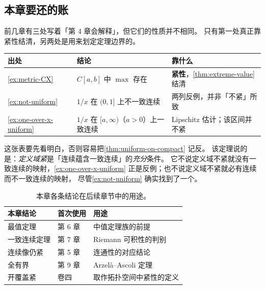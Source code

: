 \subsection*{本章要还的账}

前几章有三处写着「第 4 章会解释」，但它们的性质并不相同。
只有第一处真正靠紧性结清，另两处是用来划定定理边界的。

\begin{center}
\begin{tabular}{@{}llp{4.4cm}@{}}
  \toprule
  出处 & 结论 & 靠什么 \\
  \midrule
  \cref{ex:metric-CX} & \(C[a,b]\) 中 \(\max\) 存在 & \textbf{紧性}，\cref{thm:extreme-value} 结清 \\
  \cref{ex:not-uniform} & \(1/x\) 在 \((0,1]\) 上不一致连续 & 两列反例，并非「不紧」所致 \\
  \cref{ex:one-over-x-uniform} & \(1/x\) 在 \([a,\infty)\)（\(a>0\)）上一致连续 & Lipschitz 估计；该区间并不紧 \\
  \bottomrule
\end{tabular}
\end{center}

\begin{remark}
  这张表要先看明白，否则容易把\cref{thm:uniform-on-compact} 记反。
  该定理说的是：\emph{定义域紧}是「连续蕴含一致连续」的\emph{充分}条件。
  它不说定义域不紧就没有一致连续的映射，\cref{ex:one-over-x-uniform}
  正是反例；也不说定义域不紧就必有连续而不一致连续的映射，
  尽管\cref{ex:not-uniform} 确实找到了一个。
\end{remark}

\begin{table}[htbp]
  \centering
  \caption{本章各条结论在后续章节中的用途。}
  \label{tab:ch4-where-used}
  \begin{tabular}{@{}lll@{}}
    \toprule
    本章结论 & 首次使用 & 用途 \\
    \midrule
    最值定理       & 第 6 章 & 中值定理族的前提 \\
    一致连续定理   & 第 7 章 & Riemann 可积性的判别 \\
    连续像仍紧     & 第 5 章 & 连通性的对应结论 \\
    全有界         & 第 9 章 & Arzelà--Ascoli 定理 \\
    开覆盖紧       & 卷四     & 取作拓扑空间中紧性的定义 \\
    \bottomrule
  \end{tabular}
\end{table}

